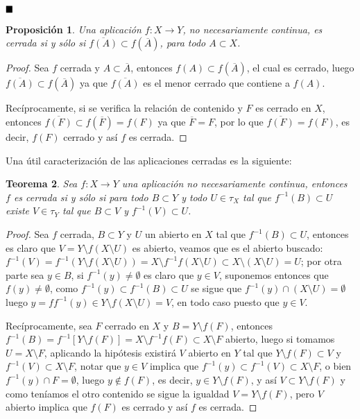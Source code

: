 \documentclass[12pt]{article}
\newtheorem{theorem}{Teorema}[section]
\newtheorem{proposition}[theorem]{Proposición}
\begin{document}
$\hfill \blacksquare$

\begin{proposition}Una aplicación $f \colon X \longrightarrow Y$, no necesariamente continua, es cerrada si y sólo si $\overline{f(A)} \subset f(\overline{A})$, para todo $A \subset X$.
\end{proposition}
\begin{proof}
Sea $f$ cerrada y $A \subset \overline{A}$, entonces $f(A) \subset f(\overline{A})$, el cual es cerrado, luego $\overline{f(A)} \subset f(\overline{A})$ ya que $\overline{f(A)}$ es el menor cerrado que contiene a $f(A)$.

Recíprocamente, si se verifica la relación de contenido y $F$ es cerrado en $X$, entonces $\overline{f(F)} \subset f(\overline{F}) = f(F)$ ya que $\overline{F} = F$, por lo que $\overline{f(F)} = f(F)$, es decir, $f(F)$ cerrado y así $f$ es cerrada.

\end{proof}

Una útil caracterización de las aplicaciones cerradas es la siguiente: 

\begin{theorem}
Sea $f \colon X \longrightarrow Y$ una aplicación no necesariamente continua, entonces $f$ es cerrada si y sólo si para todo $B \subset Y$ y todo $U \in \tau_X$ tal que $f^{-1}(B) \subset U$ existe $V \in \tau_Y$ tal que $B \subset V$ y $f^{-1}(V) \subset U$.
\end{theorem}
\begin{proof}
Sea $f$ cerrada, $B \subset Y$ y $U$ un abierto en $X$ tal que $f^{-1}(B) \subset U$, entonces es claro que $V = Y \setminus f(X\setminus U)$ es abierto, veamos que es el abierto buscado: $f^{-1}(V) = f^{-1}(Y \setminus f(X\setminus U)) = X \setminus f^{-1}f(X\setminus U) \subset X \setminus (X \setminus U) = U$; por otra parte sea $y \in B$, si $f^{-1}(y) \neq \emptyset$ es claro que $y \in V$, suponemos entonces que $f(y) \neq \emptyset$, como $f^{-1}(y) \subset f^{-1}(B) \subset U$ se sigue que $f^{-1}(y) \cap (X \setminus U) = \emptyset$ luego $y= ff^{-1}(y) \in Y \setminus f(X \setminus U) = V$, en todo caso puesto que $y \in V$.

Recíprocamente, sea $F$ cerrado en $X$ y $B = Y \setminus f(F)$, entonces $f^{-1}(B) = f^{-1}[Y \setminus f(F)] = X \setminus f^{-1}f(F) \subset X \setminus F$ abierto, luego si tomamos $U = X \setminus F$, aplicando la hipótesis existirá $V$ abierto en $Y$ tal que $Y \setminus f(F) \subset V$ y $f^{-1}(V) \subset X \setminus F$, notar que $y \in V$ implica que $f^{-1}(y) \subset f^{-1}(V) \subset X \setminus F$, o bien $f^{-1}(y)\cap F = \emptyset$, luego $y \notin f(F)$, es decir,  $y \in Y \setminus f(F)$, y así $V \subset Y \setminus f(F)$ y como teníamos el otro contenido se sigue la igualdad $V = Y \setminus f(F)$, pero $V$ abierto implica que $f(F)$ es cerrado y así $f$ es cerrada.

\end{proof}
\end{document}
